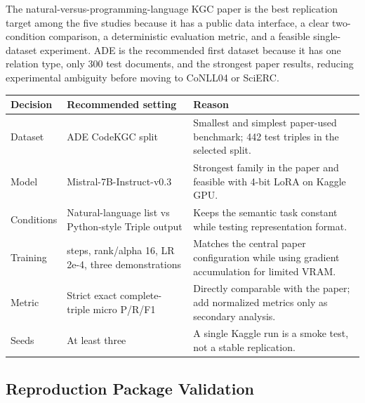 \documentclass[11pt]{article}
\newcounter{none} %
\begin{document}
The natural-versus-programming-language KGC paper is the best
replication target among the five studies because it has a public data
interface, a clear two-condition comparison, a deterministic evaluation
metric, and a feasible single-dataset experiment. ADE is the recommended
first dataset because it has one relation type, only 300 test documents,
and the strongest paper results, reducing experimental ambiguity before
moving to CoNLL04 or SciERC.

{\footnotesize
\def\LTcaptype{none} %
\begin{longtable}[]{@{}
  >{\raggedright\arraybackslash}p{}
  >{\raggedright\arraybackslash}p{}
  >{\raggedright\arraybackslash}p{}@{}}
\toprule\noalign{}
\begin{minipage}[b]{\linewidth}\centering
\textbf{Decision}
\end{minipage} & \begin{minipage}[b]{\linewidth}\centering
\textbf{Recommended setting}
\end{minipage} & \begin{minipage}[b]{\linewidth}\centering
\textbf{Reason}
\end{minipage} \\
\midrule\noalign{}
\endhead
\bottomrule\noalign{}
\endlastfoot
Dataset & ADE CodeKGC split & Smallest and simplest paper-used
benchmark; 442 test triples in the selected split. \\
Model & Mistral-7B-Instruct-v0.3 & Strongest family in the paper and
feasible with 4-bit LoRA on Kaggle GPU. \\
Conditions & Natural-language list vs Python-style Triple output & Keeps
the semantic task constant while testing representation format. \\
Training & 200 steps, rank/alpha 16, LR 2e-4, three demonstrations &
Matches the central paper configuration while using gradient
accumulation for limited VRAM. \\
Metric & Strict exact complete-triple micro P/R/F1 & Directly comparable
with the paper; add normalized metrics only as secondary analysis. \\
Seeds & At least three & A single Kaggle run is a smoke test, not a
stable replication. \\
\end{longtable}
\normalsize
}

\subsection{Reproduction Package Validation}
\label{reproduction-package-validation}
\end{document}
